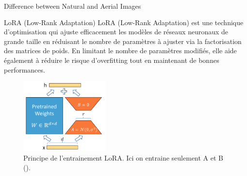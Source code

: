 \begin{subsectionframemod}{Difference between Natural and Aerial Images}
    \begin{alertblock}{LoRA (Low-Rank Adaptation)}
        LoRA (Low-Rank Adaptation) est une technique d'optimisation qui ajuste efficacement les modèles de réseaux neuronaux de grande taille en réduisant le nombre de paramètres à ajuster via la factorisation des matrices de poids.
        En limitant le nombre de paramètres modifiés, elle aide également à réduire le risque d'overfitting tout en maintenant de bonnes performances.
    \end{alertblock}
    \vspace{5mm}

    \begin{figure}
        \includegraphics[width=0.4\textwidth]{Figures/lora.png}
        \caption{Principe de l'entrainement LoRA. Ici on entraine seulement A et B (\cite{lora}).}
    \end{figure}


\end{subsectionframemod}